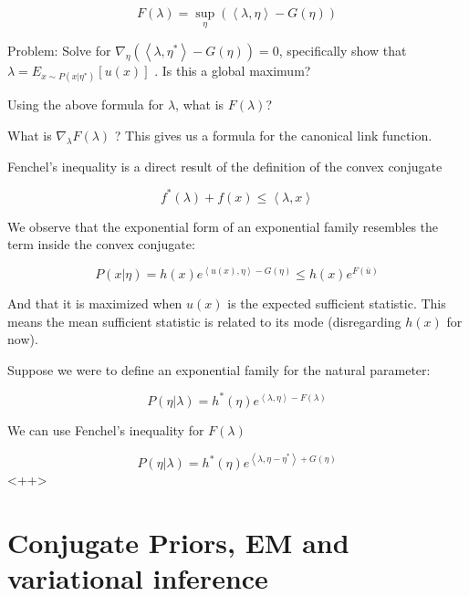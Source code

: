 \documentclass[a4paper]{article}
\begin{document}
\begin{equation}
  F( \lambda ) = \sup_\eta \left( \left< \lambda, \eta \right> - G(\eta) \right)
  \label{}
\end{equation}

Problem:  
Solve for $ \nabla_\eta \left( \left< \lambda, \eta^* \right> - G(\eta) \right) = 0 $, specifically show that $ \lambda = E_{ x \sim P( x \vert \eta^*) } \left[ u(x) \right] $ .  Is this a global maximum?  

Using the above formula for $\lambda$, what is $F(\lambda)$?  

What is $\nabla_\lambda F(\lambda)$ ?  This gives us a formula for the canonical link function.

Fenchel's inequality is a direct result of the definition of the convex conjugate

\begin{equation}
  f^*( \lambda) + f(x) \leq \left< \lambda, x \right>
  \label{Fenchel's inequality}
\end{equation}

We observe that the exponential form of an exponential family resembles the term inside the convex conjugate:

\begin{equation}
  P( x \vert \eta) = h(x) e^{ \left< u(x), \eta \right> - G(\eta) } \leq h(x) e^{ F( \bar{u} ) }
  \label{}
\end{equation}

And that it is maximized when $u(x)$ is the expected sufficient statistic.  This means the mean sufficient statistic is related to its mode (disregarding $h(x)$ for now).  

Suppose we were to define an exponential family for the natural parameter:

\begin{equation}
  P( \eta \vert \lambda ) = h^*(\eta) e^{ \left< \lambda, \eta \right> - F(\lambda) }
  \label{}
\end{equation}

We can use Fenchel's inequality for $F(\lambda)$

\begin{equation}
  P( \eta \vert \lambda ) = h^*(\eta) e^{ \left< \lambda, \eta - \eta^* \right> + G(\eta) }
  \label{<++>}
\end{equation}<++>

\section{Conjugate Priors, EM and variational inference}
\end{document}
